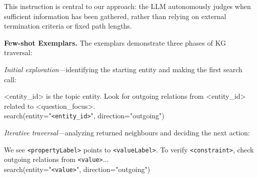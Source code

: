 \documentclass[sigconf]{acmart}
\begin{document}
\noindent This instruction is central to our approach: the LLM autonomously judges when sufficient information has been gathered, rather than relying on external termination criteria or fixed path lengths.

\noindent \textbf{Few-shot Exemplars.}
The exemplars demonstrate three phases of KG traversal:

\textit{Initial exploration}---identifying the starting entity and making the first search call:
\begin{promptbox}
<entity\_id> is the topic entity. Look for outgoing relations from <entity\_id> related to <question\_focus>.\\
search(entity="\texttt{<entity\_id>}", direction="outgoing")
\end{promptbox}



\textit{Iterative traversal}---analyzing returned neighbours and deciding the next action:
\begin{promptbox}
We see \texttt{<propertyLabel>} points to \texttt{<valueLabel>}. To verify \texttt{<constraint>}, check outgoing relations from \texttt{<value>}...\\
search(entity="\texttt{<value>}", direction="outgoing")
\end{promptbox}
\end{document}
